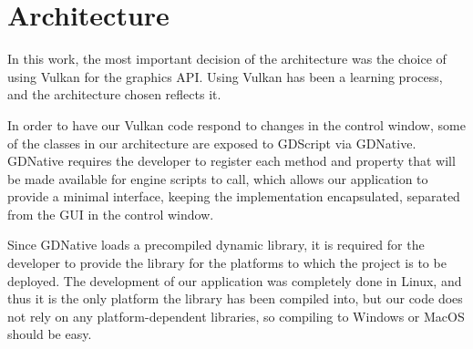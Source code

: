 \section{Architecture}
In this work, the most important decision of the architecture was the choice of using Vulkan for the graphics API. Using Vulkan has been a learning process, and the architecture chosen reflects it.

In order to have our Vulkan code respond to changes in the control window, some of the classes in our architecture are exposed to GDScript via GDNative. GDNative requires the developer to register each method and property that will be made available for engine scripts to call, which allows our application to provide a minimal interface, keeping the implementation encapsulated, separated from the GUI in the control window.

Since GDNative loads a precompiled dynamic library, it is required for the developer to provide the library for the platforms to which the project is to be deployed. The development of our application was completely done in Linux, and thus it is the only platform the library has been compiled into, but our code does not rely on any platform-dependent libraries, so compiling to Windows or MacOS should be easy.












